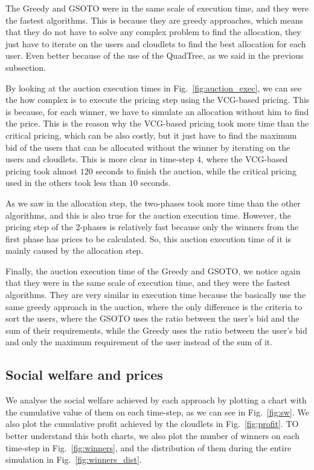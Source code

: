 \documentclass[English]{ic-tese-v3}
\begin{document}
The Greedy and GSOTO were in the same scale of execution time, and they were the fastest algorithms. This is because they are greedy approaches, which means that they do not have to solve any complex problem to find the allocation, they just have to iterate on the users and cloudlets to find the best allocation for each user. Even better because of the use of the QuadTree, as we said in the previous subsection.

By looking at the auction execution times in Fig.~\ref{fig:auction_exec}, we can see the how complex is to execute the pricing step using the VCG-based pricing. This is because, for each winner, we have to simulate an allocation without him to find the price. This is the reason why the VCG-based pricing took more time than the critical pricing, which can be also costly, but it just have to find the maximum bid of the users that can be allocated without the winner by iterating on the users and cloudlets. This is more clear in time-step $4$, where the VCG-based pricing took almost $120$ seconds to finish the auction, while the critical pricing used in the others took less than $10$ seconds.

As we saw in the allocation step, the two-phases took more time than the other algorithms, and this is also true for the auction execution time. However, the pricing step of the 2-phases is relatively fast because only the winners from the first phase has prices to be calculated. So, this auction execution time of it is mainly caused by the allocation step.

Finally, the auction execution time of the Greedy and GSOTO, we notice again that they were in the same scale of execution time, and they were the fastest algorithms. They are very similar in execution time because the basically use the same greedy approach in the auction, where the only difference is the criteria to sort the users, where the GSOTO uses the ratio between the user's bid and the sum of their requirements, while the Greedy uses the ratio between the user's bid and only the maximum requirement of the user instead of the sum of it.


\subsection{Social welfare and prices}
We analyse the social welfare achieved by each approach by plotting a chart with the cumulative value of them on each time-step, as we can see in Fig.~\ref{fig:sw}. We also plot the cumulative profit achieved by the cloudlets in Fig.~\ref{fig:profit}. TO better understand this both charts, we also plot the number of winners on each time-step in Fig.~\ref{fig:winners}, and the distribution of them during the entire simulation in Fig.~\ref{fig:winners_dist}.
\end{document}
